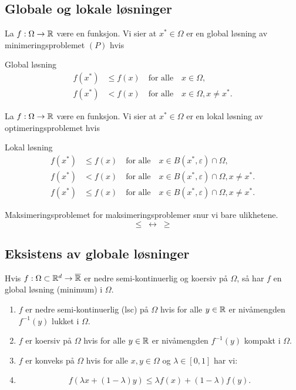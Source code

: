\documentclass[10pt, a4paper]{article}
\begin{document}
\subsection{Globale og lokale løsninger}

La \(f: \Omega \to \mathbb{R}\) være en funksjon. Vi sier at \(x^* \in \Omega\) er en global løsning av minimeringsproblemet \((P)\) hvis

\begin{definition}{Global løsning}{}
  \begin{align*}
    f(x^*) & \leq f(x) \quad \text{for alle} \quad x \in \Omega, \tag{Global løsning}                 \\
    f(x^*) & < f(x) \quad \text{for alle} \quad x \in \Omega, x \neq x^*. \tag{Streng global løsning}
  \end{align*}
\end{definition}

La \(f: \Omega \to \mathbb{R}\) være en funksjon. Vi sier at \(x^* \in \Omega\) er en lokal løsning av optimeringsproblemet hvis

\begin{definition}{Lokal løsning}{}
  \begin{align*}
    f(x^*) & \leq f(x) \quad \text{for alle} \quad x \in B(x^*, \varepsilon) \cap \Omega, \tag{Lokal løsning}                     \\
    f(x^*) & < f(x) \quad \text{for alle} \quad x \in B(x^*, \varepsilon) \cap \Omega, x \neq x^*. \tag{Streng lokal løsning}     \\
    f(x^*) & \leq f(x) \quad \text{for alle} \quad x \in B(x^*, \varepsilon) \cap \Omega, x \neq x^*. \tag{Isolert lokal løsning}
  \end{align*}
\end{definition}

\begin{remark}{Maksimeringsproblemet}{}
  for maksimeringsproblemer snur vi bare ulikhetene.
  \[
    \leq \; \leftrightarrow \; \geq
  \]
\end{remark}

\subsection*{Eksistens av globale løsninger}

Hvis \(f: \Omega \subset \mathbb{R}^d \to \overline{\mathbb{R}}\) er nedre semi-kontinuerlig og koersiv på \(\Omega\), så har \(f\) en global løsning (minimum) i \(\Omega\).

\begin{enumerate}
  \item \(f\) er nedre semi-kontinuerlig (lsc) på \(\Omega\) hvis for alle \(y \in \mathbb{R}\) er nivåmengden \(f^{-1}(y)\) lukket i \(\Omega\).
  \item \(f\) er koersiv på \(\Omega\) hvis for alle \(y \in \mathbb{R}\) er nivåmengden \(f^{-1}(y)\) kompakt i \(\Omega\).
  \item \(f\) er konveks på \(\Omega\) hvis for alle \(x, y \in \Omega\) og \(\lambda \in [0, 1]\) har vi:
  \item
        \[
          f(\lambda x + (1 - \lambda)y) \leq \lambda f(x) + (1 - \lambda)f(y).
        \]
\end{enumerate}
\end{document}
